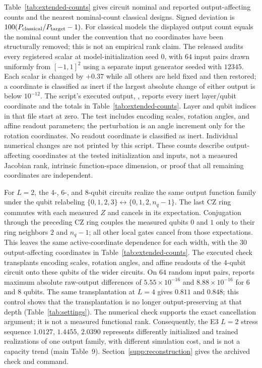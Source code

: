\documentclass[11pt]{article}
\begin{document}
Table~\ref{tab:extended-counts} gives circuit nominal and reported
output-affecting counts and the nearest nominal-count classical designs.
Signed deviation is $100(P_{\rm classical}/P_{\rm target}-1)$.
For classical models the displayed output count equals the nominal count
under the convention that no coordinates have been structurally removed;
this is not an empirical rank claim. The released  audits every registered scalar
at model-initialization seed $0$, with $64$ input pairs drawn uniformly
from $[-1,1]^2$ using a separate input generator seeded with $12345$.
Each scalar is changed by $+0.37$ while all others are held fixed and
then restored; a coordinate is classified as inert if the largest
absolute change of either output is below $10^{-12}$. The script's
executed output, , reports every
inert layer/qubit coordinate and the totals in
Table~\ref{tab:extended-counts}. Layer and qubit indices in that file
start at zero. The test includes encoding scales, rotation angles,
and affine readout parameters; the perturbation is an angle increment
only for the rotation coordinates. No readout coordinate is classified
as inert. Individual numerical changes are not printed by this script.
These counts describe output-affecting coordinates at the tested
initialization and inputs, not a measured Jacobian rank, intrinsic
function-space dimension, or proof that all remaining coordinates are
independent.

For $L=2$, the $4$-, $6$-, and $8$-qubit circuits realize the same output
function family under the qubit relabeling
$\{0,1,2,3\}\leftrightarrow\{0,1,2,n_q-1\}$.
The last CZ ring commutes with each measured $Z$ and cancels in its
expectation. Conjugation through the preceding CZ ring couples the
measured qubits $0$ and $1$ only to their ring neighbors $2$ and $n_q-1$;
all other local gates cancel from those expectations. This leaves the
same active-coordinate dependence for each width, with the $30$
output-affecting coordinates in Table~\ref{tab:extended-counts}.
The executed  check transplants encoding
scales, rotation angles, and affine readouts of the $4$-qubit circuit
onto these qubits of the wider circuits. On $64$ random input pairs,
 reports maximum absolute raw-output
differences of $5.55\times10^{-16}$ and $8.88\times10^{-16}$ for $6$ and
$8$ qubits. The same transplantation at $L=4$ gives $0.811$ and $0.848$;
this control shows that the transplantation is no longer output-preserving
at that depth (Table~\ref{tab:settings}). The numerical check supports
the exact cancellation argument; it is not a measured functional rank.
Consequently, the E3
$L=2$ stress sequence $1.0127$, $1.4455$, $2.0390$ represents differently
initialized and trained realizations of one output family, with different
simulation cost, and is not a capacity trend (main Table~9).
Section~\ref{supp:reconstruction} gives the archived check and command.
\end{document}
